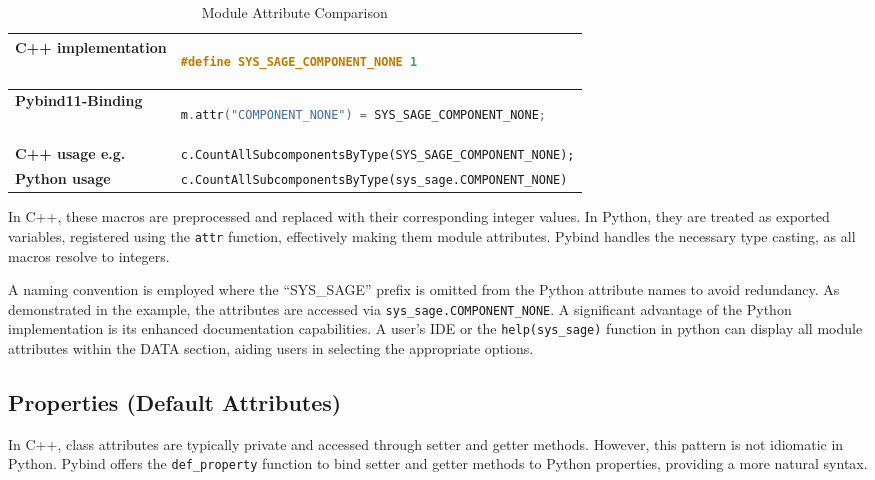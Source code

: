 \begin{table}[htbp]
\centering
\begin{tabular}{|l|l|}
\hline
\textbf{C++ implementation} & \begin{lstlisting}[language=C++]
#define SYS_SAGE_COMPONENT_NONE 1 
\end{lstlisting} \\ \hline
\textbf{Pybind11-Binding} & \begin{lstlisting}[language=C++]
m.attr("COMPONENT_NONE") = SYS_SAGE_COMPONENT_NONE;
\end{lstlisting} \\ \hline
\textbf{C++ usage e.g.} & \verb|c.CountAllSubcomponentsByType(SYS_SAGE_COMPONENT_NONE);| \\ \hline
\textbf{Python usage} & \verb|c.CountAllSubcomponentsByType(sys_sage.COMPONENT_NONE)| \\ \hline
\end{tabular}
\caption{Module Attribute Comparison}
\label{tab:module_attributes}
\end{table}

In C++, these macros are preprocessed and replaced with their corresponding integer values. In Python, they are treated as exported variables, registered using the \verb|attr| function, effectively making them module attributes. Pybind handles the necessary type casting, as all macros resolve to integers.

A naming convention is employed where the “SYS\_SAGE” prefix is omitted from the Python attribute names to avoid redundancy. As demonstrated in the example, the attributes are accessed via \verb|sys_sage.COMPONENT_NONE|.
A significant advantage of the Python implementation is its enhanced documentation capabilities. A user's \ac{IDE} or the \verb|help(sys_sage)| function in python can display all module attributes within the DATA section, aiding users in selecting the appropriate options.

\subsection{Properties (Default Attributes)}

In C++, class attributes are typically private and accessed through setter and getter methods. However, this pattern is not idiomatic in Python. Pybind offers the \verb|def_property| function to bind setter and getter methods to Python properties, providing a more natural syntax.

